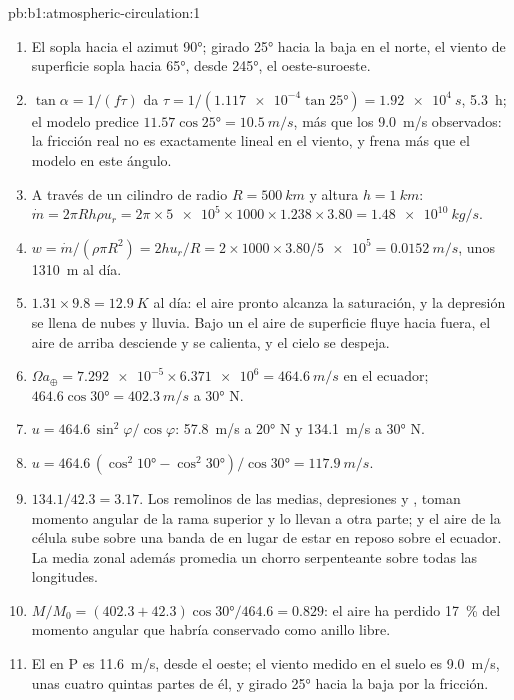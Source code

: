 \begin{solution}{pb:b1:atmospheric-circulation:1}
\begin{enumerate}
        a través de ellas hacia la baja $9.0\sin\ang{25} = \qty{3.80}{m/s}$.
  \item El  sopla hacia el azimut \ang{90}; girado \ang{25} hacia la baja en el norte, el viento de superficie sopla hacia \ang{65}, desde
        \ang{245}, el oeste-suroeste.
  \item $\tan\alpha = 1/(f\tau)$ da $\tau = 1/(\num{1.117e-4}\tan\ang{25}) =
        \qty{1.92e4}{s}$, \qty{5.3}{h}; el modelo predice $11.57\cos\ang{25} =
        \qty{10.5}{m/s}$, más que los \qty{9.0}{m/s} observados: la fricción real no es exactamente lineal en el viento, y frena más que el modelo en este ángulo.
  \item A través de un cilindro de radio $R = \qty{500}{km}$ y altura $h =
        \qty{1}{km}$: $\dot m = 2\pi R h\rho u_r = 2\pi \times \num{5e5} \times 1000
        \times 1.238 \times 3.80 = \qty{1.48e10}{kg/s}$.
  \item $w = \dot m/(\rho\pi R^2) = 2hu_r/R = 2 \times 1000 \times 3.80/\num{5e5} =
        \qty{0.0152}{m/s}$, unos \qty{1310}{m} al día.
  \item $1.31 \times 9.8 = \qty{12.9}{K}$ al día: el aire pronto alcanza la saturación, y la depresión se llena de nubes y lluvia. Bajo un  el aire de superficie fluye hacia fuera, el aire de arriba desciende y se calienta, y el cielo se despeja.
  \item $\Omega a_\oplus = \num{7.292e-5} \times \num{6.371e6} = \qty{464.6}{m/s}$
        en el ecuador; $464.6\cos\ang{30} = \qty{402.3}{m/s}$ a \ang{30} N.
  \item $u = 464.6\,\sin^2\varphi/\cos\varphi$: \qty{57.8}{m/s} a \ang{20} N y
        \qty{134.1}{m/s} a \ang{30} N.
  \item $u = 464.6\,(\cos^2\ang{10} - \cos^2\ang{30})/\cos\ang{30} =
        \qty{117.9}{m/s}$.
  \item $134.1/42.3 = 3.17$. Los remolinos de las  medias, depresiones y , toman momento angular de la rama superior y lo llevan a otra parte; y el aire de la célula sube sobre una banda de  en lugar de estar en reposo sobre el ecuador. La media zonal además promedia un chorro serpenteante sobre todas las longitudes.
  \item $M/M_0 = (402.3 + 42.3)\cos\ang{30}/464.6 = 0.829$: el aire ha perdido
        \qty{17}{\percent} del momento angular que habría conservado como anillo libre.
  \item El  en P es \qty{11.6}{m/s}, desde el oeste; el viento medido en el suelo es \qty{9.0}{m/s}, unas cuatro quintas partes de él, y girado \ang{25} hacia la baja por la fricción.
\end{enumerate}
\end{solution}
